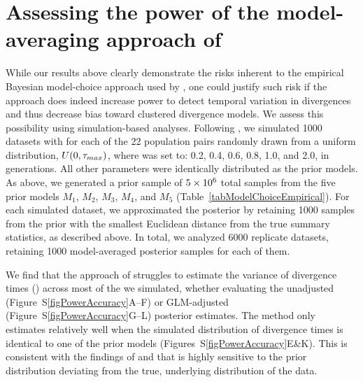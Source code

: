 



\section{Assessing the power of the model-averaging approach of
    \citet{Hickerson2013}}
While our results above clearly demonstrate the risks inherent to the empirical
Bayesian model-choice approach used by \citet{Hickerson2013}, one could justify
such risk if the approach does indeed increase power to detect temporal
variation in divergences and thus decrease bias toward clustered divergence
models.
We assess this possibility using simulation-based analyses.
Following \citet{Oaks2012}, we simulated 1000 datasets with \divt{} for each of
the 22 population pairs randomly drawn from a uniform distribution, $U(0,
\tau_{max})$, where  was set to: 0.2, 0.4, 0.6, 0.8, 1.0, and 2.0, in
\globalcoalunit generations.
All other parameters were identically distributed as the prior models.
As above, we generated a prior sample of $5\times 10^{6}$ total samples from the five
prior models $M_1$, $M_2$, $M_3$, $M_4$, and $M_5$
(Table~\ref{tabModelChoiceEmpirical}).
For each simulated dataset, we approximated the posterior
by retaining 1000 samples from the prior with the smallest Euclidean distance
from the true summary statistics, as described above.
In total, we analyzed 6000 replicate datasets, retaining 1000 model-averaged
posterior samples for each of them.

We find that the approach of \citet{Hickerson2013} struggles to estimate the
variance of divergence times (\vmratio{}) across most of the 
we simulated, whether evaluating the unadjusted
(Figure~S\ref{figPowerAccuracy}A--F) or GLM-adjusted
(Figure~S\ref{figPowerAccuracy}G--L) posterior estimates.
The method only estimates \vmratio{} relatively well when the simulated
distribution of divergence times is identical to one of the prior models
(Figures~S\ref{figPowerAccuracy}E\&K).
This is consistent with the findings of \citet{Oaks2012}  and
\citet{Hickerson2013} that \msb is highly sensitive to the prior distribution
deviating from the true, underlying distribution of the data.


